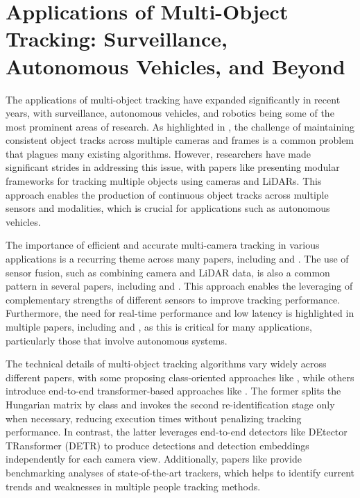 \documentclass[conference]{IEEEtran}
\begin{document}
\section{Applications of Multi-Object Tracking: Surveillance, Autonomous Vehicles, and Beyond}
The applications of multi-object tracking have expanded significantly in recent years, with surveillance, autonomous vehicles, and robotics being some of the most prominent areas of research. As highlighted in \cite{Challenge of Multi-Camera Tracking}, the challenge of maintaining consistent object tracks across multiple cameras and frames is a common problem that plagues many existing algorithms. However, researchers have made significant strides in addressing this issue, with papers like \cite{No Blind Spots: Full-Surround Multi-Object Tracking for Autonomous Vehicles} presenting modular frameworks for tracking multiple objects using cameras and LiDARs. This approach enables the production of continuous object tracks across multiple sensors and modalities, which is crucial for applications such as autonomous vehicles.

The importance of efficient and accurate multi-camera tracking in various applications is a recurring theme across many papers, including \cite{Tracking the Trackers: An Analysis of the State of the Art in Multiple Object Tracking} and \cite{CORT: Class-Oriented Real-time Tracking for Embedded Systems}. The use of sensor fusion, such as combining camera and LiDAR data, is also a common pattern in several papers, including \cite{No Blind Spots} and \cite{MCTR: Multi Camera Tracking Transformer}. This approach enables the leveraging of complementary strengths of different sensors to improve tracking performance. Furthermore, the need for real-time performance and low latency is highlighted in multiple papers, including \cite{CORT} and \cite{MCTR}, as this is critical for many applications, particularly those that involve autonomous systems.

The technical details of multi-object tracking algorithms vary widely across different papers, with some proposing class-oriented approaches like \cite{CORT}, while others introduce end-to-end transformer-based approaches like \cite{MCTR}. The former splits the Hungarian matrix by class and invokes the second re-identification stage only when necessary, reducing execution times without penalizing tracking performance. In contrast, the latter leverages end-to-end detectors like DEtector TRansformer (DETR) to produce detections and detection embeddings independently for each camera view. Additionally, papers like \cite{Tracking the Trackers} provide benchmarking analyses of state-of-the-art trackers, which helps to identify current trends and weaknesses in multiple people tracking methods.
\end{document}
